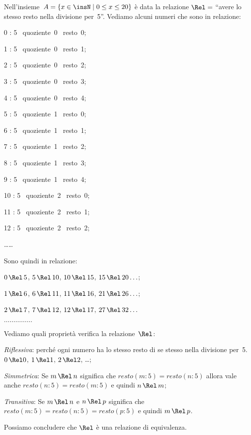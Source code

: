 \begin{exrig}
 \begin{esempio}
Nell'insieme~$A = \{x \in \insN \mid 0\le x\le 20\}$ è data la relazione $\Rel=$ ``avere lo stesso resto nella divisione per~5''.
Vediamo alcuni numeri che sono in relazione:
\begin{multicols}{2}
0 : 5 \, quoziente~0 \, resto~0;

1 : 5 \, quoziente~0 \, resto~1;

2 : 5 \, quoziente~0 \, resto~2;

3 : 5 \, quoziente~0 \, resto~3;

4 : 5 \, quoziente~0 \, resto~4;

5 : 5 \, quoziente~1 \, resto~0;

6 : 5 \, quoziente~1 \, resto~1;

7 : 5 \, quoziente~1 \, resto~2;

8 : 5 \, quoziente~1 \, resto~3;

9 : 5 \, quoziente~1 \, resto~4;

10 : 5 \, quoziente~2 \, resto~0;

11 : 5 \, quoziente~2 \, resto~1;

12 : 5 \, quoziente~2 \, resto~2;

\ldots \ldots
\end{multicols}
Sono quindi in relazione:
\begin{itemize*}
\item $0 \, \Rel \,5$, $5 \, \Rel \,10$, $10 \, \Rel \,15$,  $15 \, \Rel \,20 \ldots$;
\item $1 \, \Rel \,6$, $6 \, \Rel \,11$, $11 \, \Rel \,16$,  $21 \, \Rel \,26 \ldots$;
\item $2 \, \Rel \,7$, $7 \, \Rel \,12$, $12 \, \Rel \,17$,  $27 \, \Rel \,32 \ldots$
\item $\ldots\ldots\ldots\ldots\ldots$
\end{itemize*}

Vediamo quali proprietà verifica la relazione~$\Rel$:
\begin{itemize*}
\item \emph{Riflessiva}: perché ogni numero ha lo stesso resto di se stesso nella divisione per~5. $0 \, \Rel 0$, $1 \, \Rel 1$, $2 \, \Rel 2$, \ldots;
\item \emph{Simmetrica}: Se $m \,\Rel \, n $ significa che ${resto}(m:5)={resto}(n:5)$ allora vale anche ${resto}(n:5)={resto}(m:5)$ e quindi $n \,\Rel \, m$;
\item \emph{Transitiva}: Se $m \,\Rel \, n $ e $n \,\Rel \, p $ significa che ${resto}(m:5)={resto}(n:5)={resto}(p:5)$ e quindi $m \,\Rel \, p$.
\end{itemize*}
Possiamo concludere che $\Rel$ è una relazione di equivalenza.


\end{esempio}
\end{exrig}
